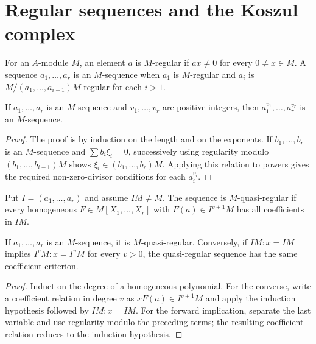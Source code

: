 
\section{Regular sequences and the Koszul complex}
\begin{definition}\label{mcrt-def-regular-sequence}\uses{}
For an $A$-module $M$, an element $a$ is $M$-regular if $ax\ne0$ for every
$0\ne x\in M$.  A sequence $a_1,\ldots,a_r$ is an $M$-sequence when $a_1$
is $M$-regular and $a_i$ is $M/(a_1,\ldots,a_{i-1})M$-regular for each $i>1$.
\end{definition}

\begin{theorem}\label{mcrt-thm-16-1}\uses{}
If $a_1,\ldots,a_r$ is an $M$-sequence and $v_1,\ldots,v_r$ are positive
integers, then $a_1^{v_1},\ldots,a_r^{v_r}$ is an $M$-sequence.
\end{theorem}
\begin{proof}
The proof is by induction on the length and on the exponents.  If
$b_1,\ldots,b_r$ is an $M$-sequence and $\sum b_i\xi_i=0$, successively using
regularity modulo $(b_1,\ldots,b_{i-1})M$ shows
$\xi_i\in(b_1,\ldots,b_r)M$.  Applying this relation to powers gives the
required non-zero-divisor conditions for each $a_i^{v_i}$.
\end{proof}

\begin{definition}\label{mcrt-def-quasi-regular}\uses{}
Put $I=(a_1,\ldots,a_r)$ and assume $IM\ne M$.  The sequence is
$M$-quasi-regular if every homogeneous $F\in M[X_1,\ldots,X_r]$ with
$F(a)\in I^{v+1}M$ has all coefficients in $IM$.
\end{definition}

\begin{theorem}\label{mcrt-thm-16-2}
If $a_1,\ldots,a_r$ is an $M$-sequence, it is $M$-quasi-regular.  Conversely,
if $IM:x=IM$ implies $I^vM:x=I^vM$ for every $v>0$, the quasi-regular
sequence has the same coefficient criterion.
\end{theorem}
\begin{proof}
Induct on the degree of a homogeneous polynomial.  For the converse, write a
coefficient relation in degree $v$ as $xF(a)\in I^{v+1}M$ and apply the
induction hypothesis followed by $IM:x=IM$.  For the forward implication,
separate the last variable and use regularity modulo the preceding terms;
the resulting coefficient relation reduces to the induction hypothesis.
\end{proof}

